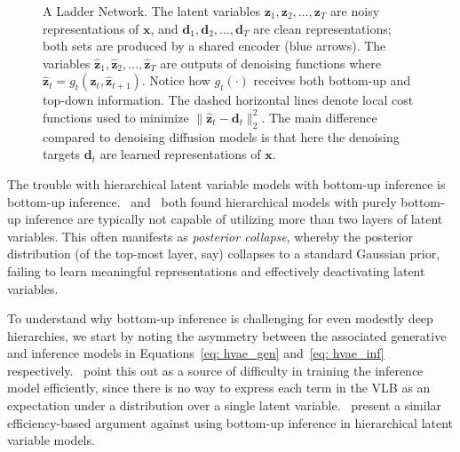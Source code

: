 \begin{figure}
    \caption{A Ladder Network. The latent variables $\mathbf{z}_1, \mathbf{z}_2, \dots, \mathbf{z}_T$ are noisy representations of $\mathbf{x}$, and $\mathbf{d}_1, \mathbf{d}_2, \dots, \mathbf{d}_T$ are clean representations; both sets are produced by a shared encoder (blue arrows). The variables $\hat{\mathbf{z}}_1, \hat{\mathbf{z}}_2, \dots, \hat{\mathbf{z}}_T$ are outputs of denoising functions where $\hat{\mathbf{z}}_t = g_t(\mathbf{z}_t, \hat{\mathbf{z}}_{t+1})$. Notice how $g_t(\cdot)$ receives both bottom-up and top-down information. The dashed horizontal lines denote local cost functions used to minimize  $\|\hat{\mathbf{z}}_t - \mathbf{d}_t \|^2_2$. The main difference compared to denoising diffusion models is that here the denoising targets $\mathbf{d}_t$ are learned representations of $\mathbf{x}$.
    }
    \label{fig: ladder}
\end{figure}
%
The trouble with hierarchical latent variable models with bottom-up inference is bottom-up inference.~\cite{burda2015importance} and~\cite{sonderby2016ladder} both found hierarchical models with purely bottom-up inference are typically not capable of utilizing more than two layers of latent variables. This often manifests as \textit{posterior collapse}, whereby the posterior distribution (of the top-most layer, say) collapses to a standard Gaussian prior, failing to learn meaningful representations and effectively deactivating latent variables.

To understand why bottom-up inference is challenging for even modestly deep hierarchies, we start by noting the asymmetry between the associated generative and inference models in Equations~\ref{eq: hvae_gen} and~\ref{eq: hvae_inf} respectively.~\cite{burda2015importance,sohl2015deep} point this out as a source of difficulty in training the inference model efficiently, since there is no way to express each term in the VLB as an expectation under a distribution over a single latent variable.~\cite{luo2022understanding} present a similar efficiency-based argument against using bottom-up inference in hierarchical latent variable models.

